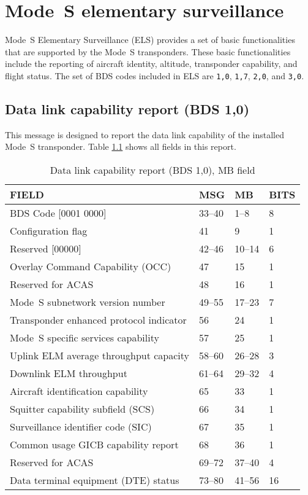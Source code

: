 \chapter{Mode~S elementary surveillance}

Mode~S Elementary Surveillance (ELS) provides a set of basic functionalities that are supported by the Mode~S transponders. These basic functionalities include the reporting  of aircraft identity, altitude, transponder capability, and flight status. The set of BDS codes included in ELS are \texttt{1,0}, \texttt{1,7}, \texttt{2,0}, and \texttt{3,0}.

\section{Data link capability report (BDS 1,0)}

This message is designed to report the data link capability of the installed Mode~S transponder. Table \ref{tb:bds10} shows all fields in this report.

\begin{table}[ht]
\centering
\caption{Data link capability report (BDS 1,0), MB field}
\label{tb:bds10}
\begin{tabular}{|l|l|l|l|}
\hline
\textbf{FIELD} & \textbf{MSG} & \textbf{MB} & \textbf{BITS} \\ \hline
BDS Code {[}0001 0000{]} & 33--40 & 1--8 & 8 \\ \hline
Configuration flag & 41 & 9 & 1 \\ \hline
Reserved {[}00000{]} & 42--46 & 10--14 & 6 \\ \hline
Overlay Command Capability (OCC) & 47 & 15 & 1 \\ \hline
Reserved for ACAS & 48 & 16 & 1 \\ \hline
Mode~S subnetwork version number & 49--55 & 17--23 & 7 \\ \hline
Transponder enhanced protocol indicator & 56 & 24 & 1 \\ \hline
Mode~S specific services capability & 57 & 25 & 1 \\ \hline
Uplink ELM average throughput capacity & 58--60 & 26--28 & 3 \\ \hline
Downlink ELM throughput & 61--64 & 29--32 & 4 \\ \hline
Aircraft identification capability & 65 & 33 & 1 \\ \hline
Squitter capability subfield (SCS) & 66 & 34 & 1 \\ \hline
Surveillance identifier code (SIC) & 67 & 35 & 1 \\ \hline
Common usage GICB capability report & 68 & 36 & 1 \\ \hline
Reserved for ACAS & 69--72 & 37--40 & 4 \\ \hline
Data terminal equipment (DTE) status & 73--80 & 41--56 & 16 \\ \hline
\end{tabular}
\end{table}


